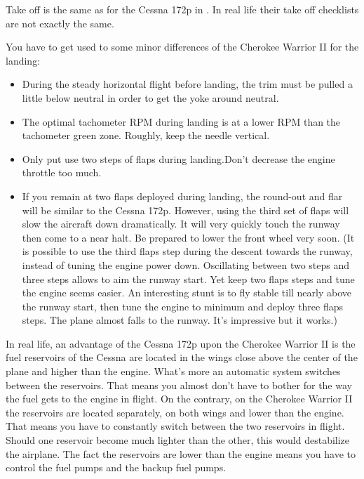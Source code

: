 Take off is the same as for the Cessna 172p in \FlightGear. In real life their
take off checklists are not exactly the same.

You have to get used to some minor differences of the Cherokee Warrior II for
the landing:

\begin{itemize}
    \item During the steady horizontal flight before landing, the trim must be
   pulled a little below neutral in order to get the yoke around neutral.
    \item The optimal tachometer RPM during landing is at a lower RPM than the
  tachometer green zone. Roughly, keep the needle vertical.
    \item Only put use two steps of flaps during landing.Don't decrease the
  engine throttle too much.
    \item If you remain at two flaps deployed during landing, the round-out and
  flar will be similar to the Cessna 172p. However, using the third set of
  flaps will slow the aircraft down dramatically. It will very quickly touch
  the runway then come to a near halt. Be prepared to lower the front wheel
  very soon. (It is possible to use the third flaps step during the descent
  towards the runway, instead of tuning the engine power down. Oscillating
  between two steps and three steps allows to aim the runway start. Yet keep
  two flaps steps and tune the engine seems easier. An interesting stunt is to
  fly stable till nearly above the runway start, then tune the engine to
  minimum and deploy three flaps steps. The plane almost falls to the runway.
  It's impressive but it works.)
\end{itemize}

In real life, an advantage of the Cessna 172p upon the Cherokee
Warrior II is the fuel reservoirs of the Cessna are located in the
wings close above the center of the plane and higher than the engine.
What's more an automatic system switches between the reservoirs. That
means you almost don't have to bother for the way the fuel gets to the
engine in flight. On the contrary, on the Cherokee Warrior II the
reservoirs are located separately, on both wings and lower than the
engine. That means you have to constantly switch between the two
reservoirs in flight. Should one reservoir become much lighter than the
other, this would destabilize the airplane. The fact the reservoirs are
lower than the engine means you have to control the fuel pumps and the
backup fuel pumps.

